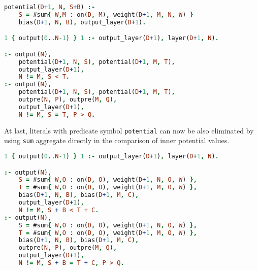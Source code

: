 \begin{lstlisting}[language=Prolog, numbers=none]
potential(D+1, N, S+B) :-
    S = #sum{ W,M : on(D, M), weight(D+1, M, N, W) }
    bias(D+1, N, B), output_layer(D+1).

1 { output(0..N-1) } 1 :- output_layer(D+1), layer(D+1, N).

:- output(N),
    potential(D+1, N, S), potential(D+1, M, T),
    output_layer(D+1),
    N != M, S < T.
:- output(N),
    potential(D+1, N, S), potential(D+1, M, T),
    outpre(N, P), outpre(M, Q),
    output_layer(D+1),
    N != M, S = T, P > Q.
\end{lstlisting}

At last, literals with predicate symbol \texttt{potential} can now be also eliminated
by using \texttt{sum} aggregate directly in the comparison of inner potential values.

\begin{lstlisting}[language=Prolog, numbers=none]
1 { output(0..N-1) } 1 :- output_layer(D+1), layer(D+1, N).

:- output(N),
    S = #sum{ W,O : on(D, O), weight(D+1, N, O, W) },
    T = #sum{ W,O : on(D, O), weight(D+1, M, O, W) },
    bias(D+1, N, B), bias(D+1, M, C),
    output_layer(D+1),
    N != M, S + B < T + C.
:- output(N),
    S = #sum{ W,O : on(D, O), weight(D+1, N, O, W) },
    T = #sum{ W,O : on(D, O), weight(D+1, M, O, W) },
    bias(D+1, N, B), bias(D+1, M, C),
    outpre(N, P), outpre(M, Q),
    output_layer(D+1),
    N != M, S + B = T + C, P > Q.
\end{lstlisting}
